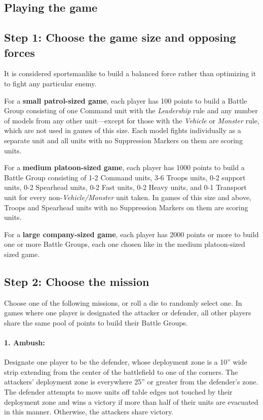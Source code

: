 \begin{multicols}{2}
\toccontents




\chapter{Playing the game}

\section*{Step 1: Choose the game size and opposing forces}
It is considered sportsmanlike to build a balanced force rather than optimizing it to fight any particular enemy.

For a \textbf{small patrol-sized game}, each player has 100 points to build a Battle Group consisting of one Command unit with the \textit{Leadership} rule and any number of models from any other unit—except for those with the \textit{Vehicle} or \textit{Monster} rule, which are not used in games of this size. Each model fights individually as a separate unit and all units with no Suppression Markers on them are scoring units.

For a \textbf{medium platoon-sized game}, each player has 1000 points to build a Battle Group consisting of 1-2 Command units, 3-6 Troops units, 0-2 support units, 0-2 Spearhead units, 0-2 Fast units, 0-2 Heavy units, and 0-1 Transport unit for every non-\textit{Vehicle/Monster} unit taken. In games of this size and above, Troops and Spearhead units with no Suppression Markers on them are scoring units.

For a \textbf{large company-sized game}, each player has 2000 points or more to build one or more Battle Groups, each one chosen like in the medium platoon-sized sized game.




\section*{Step 2: Choose the mission}
Choose one of the following missions, or roll a die to randomly select one. In games where one player is designated the attacker or defender, all other players share the same pool of points to build their Battle Groups.

\subsubsection*{1. Ambush:} Designate one player to be the defender, whose deployment zone is a 10'' wide strip extending from the center of the battlefield to one of the corners. The attackers' deployment zone is everywhere 25'' or greater from the defender's zone. The defender attempts to move units off table edges not touched by their deployment zone and wins a victory if more than half of their units are evacuated in this manner. Otherwise, the attackers share victory.


\end{multicols}
